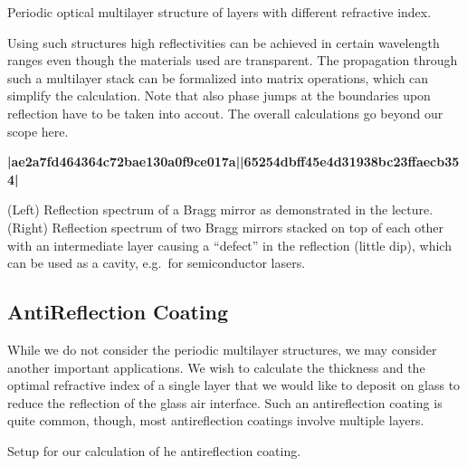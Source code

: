 \documentclass[letterpaper,10pt,english]{sphinxmanual}
\begin{document}



 Periodic optical multilayer structure of layers with different refractive index.





Using such structures high reflectivities can be achieved in certain wavelength ranges even though the materials used are transparent. The propagation through such a multilayer stack can be formalized into matrix operations, which can simplify the calculation. Note that also phase jumps at the boundaries upon reflection have to be taken into accout. The overall calculations go beyond our scope here.



{\color{red}\bfseries{}|ae2a7fd464364c72bae130a0f9ce017a||65254dbff45e4d31938bc23ffaecb354|}



 (Left) Reflection spectrum of a Bragg mirror as demonstrated in the lecture. (Right) Reflection spectrum of two Bragg mirrors stacked on top of each other with an intermediate layer causing a “defect” in the reflection (little dip), which can be used as a cavity, e.g. for semiconductor lasers.






\subsection{Anti\sphinxhyphen{}Reflection Coating}
\label{\detokenize{notebooks/L11/Interference:Anti-Reflection-Coating}}
While we do not consider the periodic multilayer structures, we may consider another important applications. We wish to calculate the thickness and the optimal refractive index of a single layer that we would like to deposit on glass to reduce the reflection of the glass air interface. Such an antireflection coating is quite common, though, most antireflection coatings involve multiple layers.






 Setup for our calculation of he anti\sphinxhyphen{}reflection coating.
\end{document}
